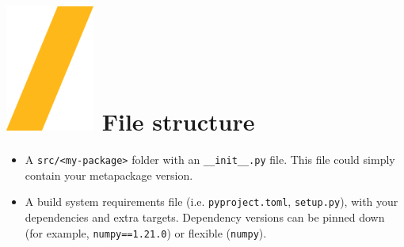 \documentclass[a0paper,fleqn]{src/betterposter}
\begin{document}
{\section{\includegraphics[height=\fontcharht\font`\S]{img/general/slash.png} File structure}
\vspace{-2cm}
\begin{itemize}
    \item A \texttt{src/<my-package>} folder with an \texttt{\_\_init\_\_.py} file. This file could simply contain your metapackage version.
    \item A build system requirements file (i.e. \texttt{pyproject.toml}, \texttt{setup.py}), with your dependencies and extra targets. Dependency versions can be pinned down (for example, \texttt{numpy==1.21.0}) or flexible (\texttt{numpy}).
\end{itemize}

\vfill

}{
}
\end{document}
